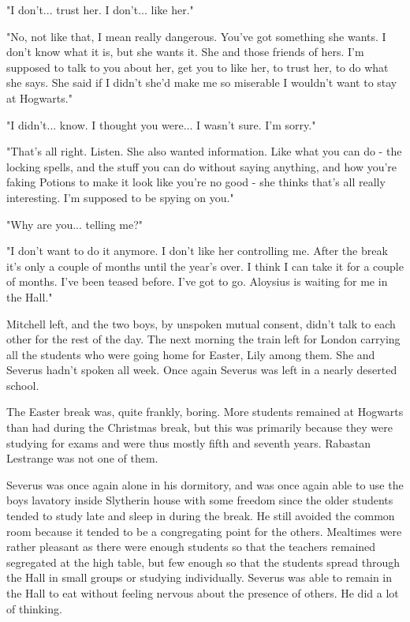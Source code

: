 \documentclass[a4paper,11pt]{article}
\begin{document}
"I don't... trust her. I don't... like her."

"No, not like that, I mean really dangerous. You've got something she wants. I don't know what it is, but she wants it. She and those friends of hers. I'm supposed to talk to you about her, get you to like her, to trust her, to do what she says. She said if I didn't she'd make me so miserable I wouldn't want to stay at Hogwarts."

"I didn't... know. I thought you were... I wasn't sure. I'm sorry."

"That's all right. Listen. She also wanted information. Like what you can do - the locking spells, and the stuff you can do without saying anything, and how you're faking Potions to make it look like you're no good - she thinks that's all really interesting. I'm supposed to be spying on you."

"Why are you... telling me?"

"I don't want to do it anymore. I don't like her controlling me. After the break it's only a couple of months until the year's over. I think I can take it for a couple of months. I've been teased before. I've got to go. Aloysius is waiting for me in the Hall."

Mitchell left, and the two boys, by unspoken mutual consent, didn't talk to each other for the rest of the day. The next morning the train left for London carrying all the students who were going home for Easter, Lily among them. She and Severus hadn't spoken all week. Once again Severus was left in a nearly deserted school.

The Easter break was, quite frankly, boring. More students remained at Hogwarts than had during the Christmas break, but this was primarily because they were studying for exams and were thus mostly fifth and seventh years. Rabastan Lestrange was not one of them.

Severus was once again alone in his dormitory, and was once again able to use the boys lavatory inside Slytherin house with some freedom since the older students tended to study late and sleep in during the break. He still avoided the common room because it tended to be a congregating point for the others. Mealtimes were rather pleasant as there were enough students so that the teachers remained segregated at the high table, but few enough so that the students spread through the Hall in small groups or studying individually. Severus was able to remain in the Hall to eat without feeling nervous about the presence of others. He did a lot of thinking.
\end{document}
